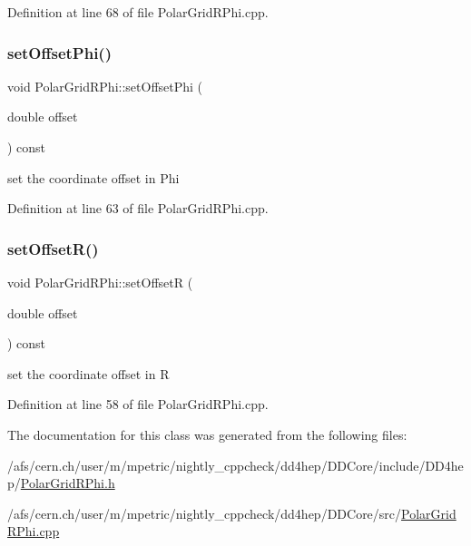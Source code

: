 Definition at line 68 of file Polar\+Grid\+R\+Phi.\+cpp.

\hypertarget{class_d_d4hep_1_1_geometry_1_1_polar_grid_r_phi_a246e0c3156b3f76a870bb74f5bc1a346}{}\label{class_d_d4hep_1_1_geometry_1_1_polar_grid_r_phi_a246e0c3156b3f76a870bb74f5bc1a346} 
\subsubsection{\texorpdfstring{set\+Offset\+Phi()}{setOffsetPhi()}}
{\footnotesize\ttfamily void Polar\+Grid\+R\+Phi\+::set\+Offset\+Phi (\begin{DoxyParamCaption}\item[{double}]{offset }\end{DoxyParamCaption}) const}



set the coordinate offset in Phi 



Definition at line 63 of file Polar\+Grid\+R\+Phi.\+cpp.

\hypertarget{class_d_d4hep_1_1_geometry_1_1_polar_grid_r_phi_a6f540807e325eccbb97e2408304bf06a}{}\label{class_d_d4hep_1_1_geometry_1_1_polar_grid_r_phi_a6f540807e325eccbb97e2408304bf06a} 
\subsubsection{\texorpdfstring{set\+Offset\+R()}{setOffsetR()}}
{\footnotesize\ttfamily void Polar\+Grid\+R\+Phi\+::set\+OffsetR (\begin{DoxyParamCaption}\item[{double}]{offset }\end{DoxyParamCaption}) const}



set the coordinate offset in R 



Definition at line 58 of file Polar\+Grid\+R\+Phi.\+cpp.



The documentation for this class was generated from the following files\+:\begin{DoxyCompactItemize}
\item 
/afs/cern.\+ch/user/m/mpetric/nightly\+\_\+cppcheck/dd4hep/\+D\+D\+Core/include/\+D\+D4hep/\hyperlink{_d_d_core_2include_2_d_d4hep_2_polar_grid_r_phi_8h}{Polar\+Grid\+R\+Phi.\+h}\item 
/afs/cern.\+ch/user/m/mpetric/nightly\+\_\+cppcheck/dd4hep/\+D\+D\+Core/src/\hyperlink{_d_d_core_2src_2_polar_grid_r_phi_8cpp}{Polar\+Grid\+R\+Phi.\+cpp}\end{DoxyCompactItemize}
